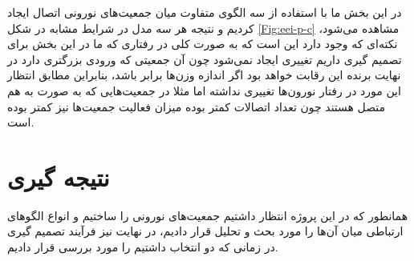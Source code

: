 \documentclass[12pt]{article}
\begin{document}
در این بخش ما با استفاده از سه الگوی متفاوت میان جمعیت‌های نورونی اتصال ایجاد کردیم و نتیجه هر سه مدل در شرایط مشابه در شکل \ref{Fig:eei-p-c} مشاهده می‌شود، نکته‌ای که وجود دارد این است که به صورت کلی در رفتاری که ما در این بخش برای تصمیم گیری داریم تغییری ایجاد نمی‌شود چون آن جمعیتی که ورودی بزرگتری دارد در نهایت برنده این رقابت خواهد بود اگر اندازه وزن‌ها برابر باشد، بنابراین مطابق انتظار این مورد در رفتار نورون‌ها تغییری نداشته اما مثلا در جمعیت‌هایی که به صورت  به هم متصل هستند چون تعداد اتصالات کمتر بوده میزان فعالیت جمعیت‌ها نیز کمتر بوده است.


\section{نتیجه گیری}

همانطور که در این پروژه انتظار داشتیم جمعیت‌های نورونی را ساختیم و انواع الگوهای ارتباطی میان ‌آن‌ها را مورد بحث و تحلیل قرار دادیم، در نهایت نیز فرآیند تصمیم گیری در زمانی که دو انتخاب داشتیم را مورد بررسی قرار دادیم.
\end{document}
